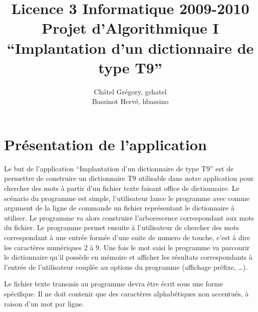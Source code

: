 \documentclass[15pt, a4paper]{article}
\title{Licence 3 Informatique 2009-2010\\
Projet d'Algorithmique I\\
``Implantation d'un dictionnaire de type T9''}
\author{Châtel Grégory, gchatel\\Bassinot Hervé, hbassino}
\begin{document}
\maketitle{}

\clearpage

\tableofcontents

\clearpage


\clearpage

\section{Présentation de l'application}

Le but de l'application ``Implantation d'un dictionnaire de type T9'' est de permettre de construire 
un dictionnaire T9 utilisable dans notre application pour chercher des mots à partir d'un fichier texte
faisant office de dictionnaire. Le scénario du programme est simple, l'utilisateur lance le programme 
avec comme argument de la ligne de commande un fichier représentant le dictionnaire à utiliser. Le programme 
va alors construire l'arborescence correspondant aux mots du fichier. Le programme permet ensuite à 
l'utilisateur de chercher des mots correspondant à une entrée formée d'une suite de numero de touche,
c'est à dire les caractères numériques 2 à 9. Une fois le mot saisi le programme va parcourir le 
dictionnaire qu'il possède en mémoire et afficher les résultats correspondants à l'entrée de l'utilisateur
couplée au options du programme (affichage préfixe, \dots).

\bigskip

Le fichier texte transmis au programme devra être écrit sous une forme spécifique. Il ne doit contenir
que des caractères alphabétiques non accentués, à raison d'un mot par ligne.
\end{document}
